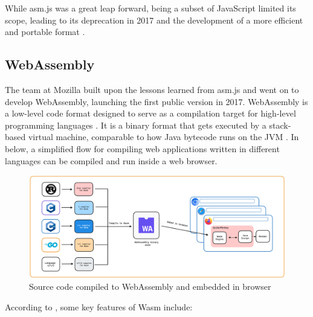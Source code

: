 \documentclass[
  table]{report}
\begin{document}
While asm.js was a great leap forward, being a subset of JavaScript
limited its scope, leading to its deprecation in 2017 and the
development of a more efficient and portable format
\citep{webassembly.orgFAQWebAssembly}.

\subsection{WebAssembly}

The team at Mozilla built upon the lessons learned from asm.js and went
on to develop WebAssembly, launching the first public version in 2017.
WebAssembly is a low-level code format designed to serve as a
compilation target for high-level programming languages
\citep{haasBringingWebSpeed2017}. It is a binary format that gets
executed by a stack-based virtual machine, comparable to how Java
bytecode runs on the \ac{JVM} \citep{haasBringingWebSpeed2017}. In
 below, a simplified flow for compiling web
applications written in different languages can be compiled and run
inside a web browser.

\begin{figure}[H]
\centering
  \includegraphics{assets/wasm-browser.png}
  \caption{Source code compiled to WebAssembly and embedded in browser}
  \label{fig:wasm-browser}
\end{figure}

According to \citet{haasBringingWebSpeed2017}, some key features of
\ac{Wasm} include:
\end{document}
